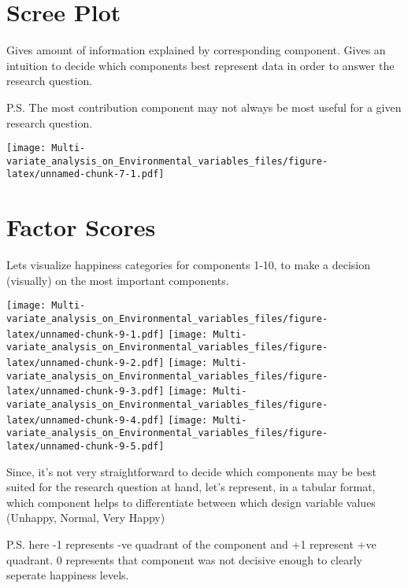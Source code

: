 \documentclass[]{book}
\begin{document}
\hypertarget{scree-plot}{%
\section{Scree Plot}\label{scree-plot}}

Gives amount of information explained by corresponding component. Gives
an intuition to decide which components best represent data in order to
answer the research question.

P.S. The most contribution component may not always be most useful for a
given research question.

\texttt{[image: Multi-variate\_analysis\_on\_Environmental\_variables\_files/figure-latex/unnamed-chunk-7-1.pdf]}

\hypertarget{factor-scores}{%
\section{Factor Scores}\label{factor-scores}}

Lets visualize happiness categories for components 1-10, to make a
decision (visually) on the most important components.

\texttt{[image: Multi-variate\_analysis\_on\_Environmental\_variables\_files/figure-latex/unnamed-chunk-9-1.pdf]}
\texttt{[image: Multi-variate\_analysis\_on\_Environmental\_variables\_files/figure-latex/unnamed-chunk-9-2.pdf]}
\texttt{[image: Multi-variate\_analysis\_on\_Environmental\_variables\_files/figure-latex/unnamed-chunk-9-3.pdf]}
\texttt{[image: Multi-variate\_analysis\_on\_Environmental\_variables\_files/figure-latex/unnamed-chunk-9-4.pdf]}
\texttt{[image: Multi-variate\_analysis\_on\_Environmental\_variables\_files/figure-latex/unnamed-chunk-9-5.pdf]}

Since, it's not very straightforward to decide which components may be
best suited for the research question at hand, let's represent, in a
tabular format, which component helps to differentiate between which
design variable values (Unhappy, Normal, Very Happy)

P.S. here -1 represents -ve quadrant of the component and +1 represent
+ve quadrant. 0 represents that component was not decisive enough to
clearly seperate happiness levels.
\end{document}

